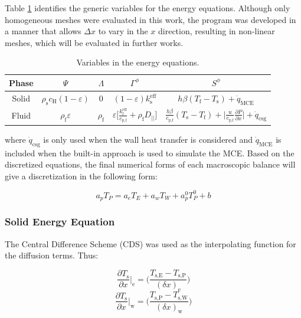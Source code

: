 \documentclass[review,preprint,12pt]{elsarticle}
\begin{document}
Table \ref{tab:EnEqVar} identifies the generic variables for the energy equations. Although only homogeneous meshes were evaluated in this work, the program was developed in a manner that allows $\Delta x$ to vary in the $x$ direction, resulting in non-linear meshes, which will be evaluated in further works.

\begin{table}[htp]\footnotesize
\caption{Variables in the energy equations.}
\label{tab:EnEqVar} 
\centering
\begin{tabular}{ccccc}
\toprule
Phase &  $\Psi$ & $\Lambda$ & $\Gamma^{\phi}$ & $S^{\phi}$\\\toprule
Solid  & $\rho_\textrm{s} c_\textrm{H}(1-\varepsilon)$ & 0 & $(1-\varepsilon)k_\textrm{s}^\textrm{eff}$ & $h \beta (T_\textrm{f}-T_\textrm{s}) + \dot{q}_\textrm{MCE}$\\\hline
{Fluid} &  {$\rho_\textrm{f} \varepsilon$} & {$\rho_\textrm{f} $} & $\varepsilon\bigl[\frac{k^\textrm{eff}_\textrm{f}}{c_\textrm{p,f}} + \rho_\textrm{f} D_{||}\bigr]$ & $\frac{h\beta}{c_\textrm{p,f}}(T_\textrm{s}-T_\textrm{f}) + \Biggl|\frac{u}{c_\textrm{p,f}}\frac{\partial P}{\partial x}\Biggr| + \dot{q}_\textrm{csg}$\\
\bottomrule
\end{tabular}
\end{table} 

\noindent where $\dot{q}_\textrm{csg}$ is only used when the wall heat transfer is considered and $\dot{q}_\textrm{MCE}$ is included when the built-in approach is used to simulate the MCE. Based on the discretized equations, the final numerical forms of each macroscopic balance will give a discretization in the following form:

\begin{equation}
a_pT_P = a_eT_E + a_wT_W + a_p^0T^0_P + b
\label{Gen_dis_eq}
\end{equation}

\subsubsection{Solid Energy Equation}
\label{sec:disc-solid}

The Central Difference Scheme (CDS) was used as the interpolating function for the diffusion terms. Thus:


\begin{equation}
\frac{\partial T_\textrm{s}}{\partial x}\bigg|_\textrm{e} = \Biggl(\frac{T_\textrm{s,E}-T_\textrm{s,P}}{(\delta x)_\textrm{e}} \Biggr)
\end{equation}
\begin{equation}
\frac{\partial T_\textrm{s}}{\partial x}\bigg|_\textrm{w} = \Biggl(\frac{T_\textrm{s,P}-T_\textrm{s,W}}{(\delta x)_\textrm{w}} \Biggr)
\end{equation}
\end{document}

